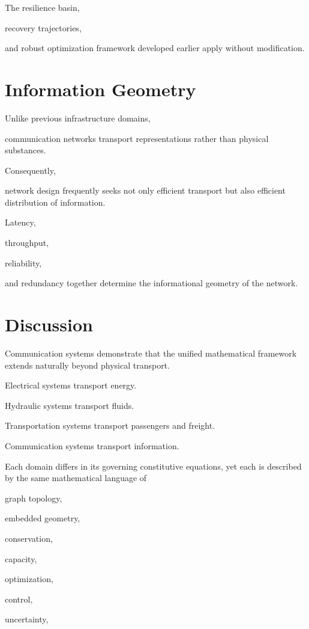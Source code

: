 \documentclass[11pt,fleqn]{book}
\numberwithin{equation}{chapter}
\theoremstyle{plain}
\theoremstyle{definition}
\theoremstyle{remark}
\begin{document}
The resilience basin,

recovery trajectories,

and robust optimization framework developed earlier apply without
modification.


\section{Information Geometry}

Unlike previous infrastructure domains,

communication networks transport representations rather than physical
substances.

Consequently,

network design frequently seeks not only efficient transport but also
efficient distribution of information.

Latency,

throughput,

reliability,

and redundancy together determine the informational geometry of the
network.


\section{Discussion}

Communication systems demonstrate that the unified mathematical
framework extends naturally beyond physical transport.

Electrical systems transport energy.

Hydraulic systems transport fluids.

Transportation systems transport passengers and freight.

Communication systems transport information.

Each domain differs in its governing constitutive equations, yet each is
described by the same mathematical language of

graph topology,

embedded geometry,

conservation,

capacity,

optimization,

control,

uncertainty,
\end{document}

